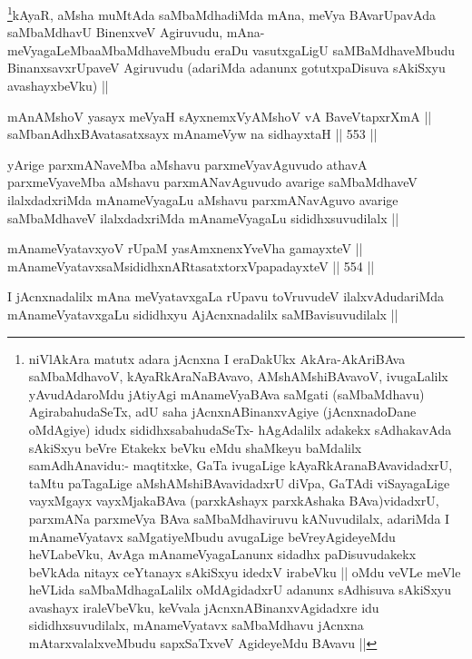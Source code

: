 \begin{artha}
\footnote{niVlAkAra matutx adara jAcnxna I eraDakUkx AkAra-AkAriBAva saMbaMdhavoV, kAyaRkAraNaBAvavo, AMshAMshiBAvavoV, ivugaLalilx yAvudAdaroMdu jAtiyAgi mAnameVyaBAva saMgati (saMbaMdhavu) AgirabahudaSeTx, adU saha jAcnxnABinanxvAgiye (jAcnxnadoDane oMdAgiye) idudx sididhxsabahudaSeTx- hAgAdalilx adakekx sAdhakavAda sAkiSxyu beVre Etakekx beVku eMdu shaMkeyu baMdalilx samAdhAnavidu:- maqtitxke, GaTa ivugaLige kAyaRkAranaBAvavidadxrU, taMtu paTagaLige aMshAMshiBAvavidadxrU diVpa, GaTAdi viSayagaLige vayxMgayx vayxMjakaBAva (parxkAshayx parxkAshaka BAva)vidadxrU, parxmANa parxmeVya BAva saMbaMdhaviruvu kANuvudilalx, adariMda I mAnameVyatavx saMgatiyeMbudu avugaLige beVreyAgideyeMdu heVLabeVku, AvAga mAnameVyagaLanunx sidadhx paDisuvudakekx beVkAda nitayx ceYtanayx sAkiSxyu idedxV irabeVku || oMdu veVLe meVle heVLida saMbaMdhagaLalilx oMdAgidadxrU adanunx sAdhisuva sAkiSxyu avashayx iraleVbeVku, keVvala jAcnxnABinanxvAgidadxre idu sididhxsuvudilalx, mAnameVyatavx saMbaMdhavu jAcnxna mAtarxvalalxveMbudu sapxSaTxveV AgideyeMdu BAvavu ||}kAyaR, aMsha muMtAda saMbaMdhadiMda mAna, meVya BAvarUpavAda saMbaMdhavU BinenxveV Agiruvudu, mAna-meVyagaLeMbaaMbaMdhaveMbudu eraDu vasutxgaLigU saMBaMdhaveMbudu BinanxsavxrUpaveV Agiruvudu (adariMda adanunx gotutxpaDisuva sAkiSxyu avashayxbeVku) ||
\end{artha}


\begin{shl}
mAnAMshoV yasayx meVyaH sAyxnemxVyAMshoV vA BaveVtapxrXmA || \\
saMbanAdhxBAvatasatxsayx mAnameVyw na sidhayxtaH ||  553 ||  
\end{shl}

\begin{artha}
yArige parxmANaveMba aMshavu parxmeVyavAguvudo athavA parxmeVyaveMba aMshavu parxmANavAguvudo avarige saMbaMdhaveV ilalxdadxriMda mAnameVyagaLu aMshavu parxmANavAguvo avarige saMbaMdhaveV ilalxdadxriMda mAnameVyagaLu sididhxsuvudilalx ||
\end{artha}

\begin{shl}
mAnameVyatavxyoV rUpaM yasAmxnenxYveVha gamayxteV || \\
mAnameVyatavxsaMsididhxnARtasatxtorxVpapadayxteV ||  554 ||  
\end{shl}

\begin{artha}
I jAcnxnadalilx mAna meVyatavxgaLa rUpavu toVruvudeV ilalxvAdudariMda mAnameVyatavxgaLu sididhxyu AjAcnxnadalilx saMBavisuvudilalx ||
\end{artha}

